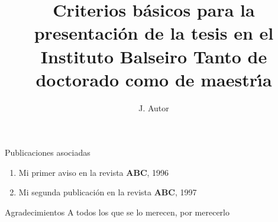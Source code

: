 \documentclass[12pt,screen,twoside,pagebackref]{ibtesis}
\title{Criterios b\'{a}sicos para la presentaci\'{o}n de la tesis en el Instituto Balseiro Tanto de doctorado como de maestr\'{\i}a}
\author{J. Autor}
\begin{document}

\begin{preliminary}



\begin{abreviaturas}
\end{abreviaturas}

\tableofcontents                %





\end{preliminary}





	


\appendix
%

\begin{biblio}

\end{biblio}


\begin{postliminary}

\begin{seccion}{Publicaciones asociadas}
  \begin{enumerate}
  \item Mi primer aviso en la revista \textbf{ABC}, 1996
  \item Mi segunda publicaci\'{o}n en la revista \textbf{ABC}, 1997
  \end{enumerate}
\end{seccion}

\begin{seccion}{Agradecimientos}
A todos los que se lo merecen, por merecerlo
\end{seccion}

\end{postliminary}
\end{document}
